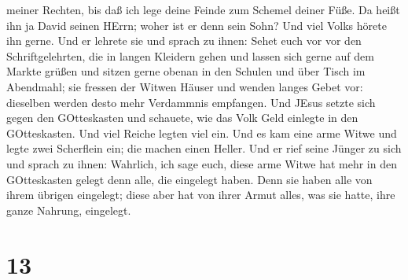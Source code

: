 meiner Rechten, bis daß ich lege deine Feinde zum Schemel deiner Füße.
 Da heißt ihn ja David seinen HErrn; woher ist er denn sein
Sohn? Und viel Volks hörete ihn gerne.  Und er lehrete sie
und sprach zu ihnen: Sehet euch vor vor den Schriftgelehrten, die in
langen Kleidern gehen und lassen sich gerne auf dem Markte grüßen
 und sitzen gerne obenan in den Schulen und über Tisch im
Abendmahl;  sie fressen der Witwen Häuser und wenden langes
Gebet vor: dieselben werden desto mehr Verdammnis empfangen.
 Und JEsus setzte sich gegen den GOtteskasten und schauete,
wie das Volk Geld einlegte in den GOtteskasten. Und viel Reiche legten
viel ein.  Und es kam eine arme Witwe und legte zwei
Scherflein ein; die machen einen Heller.  Und er rief seine
Jünger zu sich und sprach zu ihnen: Wahrlich, ich sage euch, diese arme
Witwe hat mehr in den GOtteskasten gelegt denn alle, die eingelegt
haben.  Denn sie haben alle von ihrem übrigen eingelegt;
diese aber hat von ihrer Armut alles, was sie hatte, ihre ganze Nahrung,
eingelegt.

\hypertarget{section-12}{%
\section{13}\label{section-12}}

